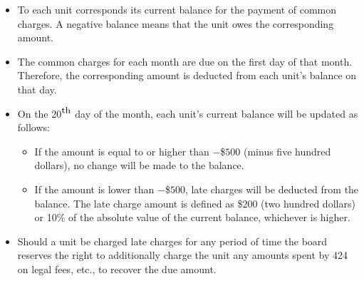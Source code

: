 \begin{itemize}

\item To each unit corresponds its current balance for the payment of common
charges. A negative balance means that the unit owes the corresponding amount.

\item The common charges for each month are due on the first day of that month.
Therefore, the corresponding amount is deducted from each unit's balance on that
day.


\item On the 20$^{\textrm{\small th}}$ day of the month, each unit's current
balance will be updated as follows:

\begin{itemize}

\item If the amount is equal to or higher than $-$\$$500$ (minus five hundred dollars), no
change will be made to the balance.

\item If the amount is lower than $-$\$$500$, late charges will be deducted from
the balance. The late charge amount is defined as \$$200$ (two hundred dollars)
or 10\% of the absolute value of the current balance, whichever is higher.

\end{itemize}

\item Should a unit be charged late charges for any period of time the board
reserves the right to additionally charge the unit any amounts spent by 424
on legal fees, etc., to recover the due amount.

\end{itemize}



